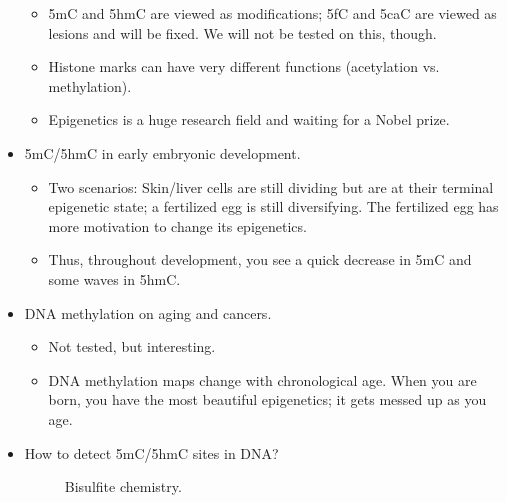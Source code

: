 \documentclass[../notes.tex]{subfiles}
\begin{document}
\begin{itemize}
\begin{itemize}
        \item 5mC and 5hmC are viewed as modifications; 5fC and 5caC are viewed as lesions and will be fixed. We will not be tested on this, though.
        \item Histone marks can have very different functions (acetylation vs. methylation).
        \item Epigenetics is a huge research field and waiting for a Nobel prize.
    \end{itemize}
    \item 5mC/5hmC in early embryonic development.
    \begin{itemize}
        \item Two scenarios: Skin/liver cells are still dividing but are at their terminal epigenetic state; a fertilized egg is still diversifying. The fertilized egg has more motivation to change its epigenetics.
        \item Thus, throughout development, you see a quick decrease in 5mC and some waves in 5hmC.
    \end{itemize}
    \item DNA methylation on aging and cancers.
    \begin{itemize}
        \item Not tested, but interesting.
        \item DNA methylation maps change with chronological age. When you are born, you have the most beautiful epigenetics; it gets messed up as you age.
    \end{itemize}
    \item How to detect 5mC/5hmC sites in DNA?
    \begin{figure}[h!]
        \centering
        \footnotesize
        \caption{Bisulfite chemistry.}

\end{figure}
\end{itemize}
\end{document}
